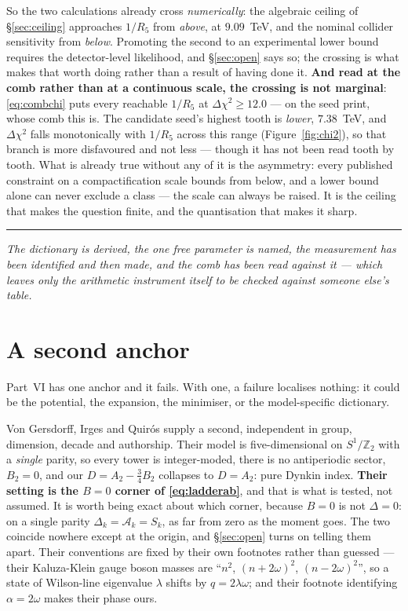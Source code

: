 \documentclass[11pt,a4paper]{article}
\newcommand{\ZZ}{\mathbb{Z}}
\newcommand{\bridge}[1]{\par\medskip\noindent
  \textcolor{hdrblue!45}{\rule{2.2cm}{0.6pt}}\;\;\parbox[t]{0.84\textwidth}{\small\itshape
  \textcolor{hdrblue!85}{#1}}\par\medskip}
\newenvironment{keyeq}
  {\begin{center}\setlength{\fboxsep}{9pt}\setlength{\fboxrule}{0.8pt}%
   \begin{lrbox}{\keyeqbox}\begin{minipage}{0.88\textwidth}}
  {\end{minipage}\end{lrbox}%
   \fcolorbox{hdrblue!55}{hdrblue!6}{\usebox{\keyeqbox}}\end{center}}
\begin{document}
\begin{keyeq}
So the two calculations already cross \emph{numerically}: the algebraic ceiling of
\S\ref{sec:ceiling} approaches $1/R_5$ from \emph{above}, at $9.09$~TeV, and the nominal collider
sensitivity from \emph{below}. Promoting the second to an experimental lower bound requires the
detector-level likelihood, and \S\ref{sec:open} says so; the crossing is what makes that worth
doing rather than a result of having done it. \textbf{And read at the comb rather than at a
continuous scale, the crossing is not marginal}: \eqref{eq:combchi} puts every reachable
$1/R_5$ at $\Delta\chi^2\ge12.0$ --- on the seed \cite{KM25} print, whose comb this is. The
candidate seed's highest tooth is \emph{lower}, $7.38$~TeV, and $\Delta\chi^2$ falls
monotonically with $1/R_5$ across this range (Figure~\ref{fig:chi2}), so that branch is more
disfavoured and not less --- though it has not been read tooth by tooth. What is already true without any of it is the asymmetry:
every published constraint on a compactification scale bounds from below, and a lower bound alone
can never exclude a class --- the scale can always be raised. It is the ceiling that makes the
question finite, and the quantisation that makes it sharp.
\end{keyeq}

\bridge{The dictionary is derived, the one free parameter is named, the measurement has been
identified and then made, and the comb has been read against it --- which leaves only the
arithmetic instrument itself to be checked against someone else's table.}

\section{A second anchor}\label{sec:anchor}

Part~VI has one anchor and it fails. With one, a failure localises nothing: it could be the
potential, the expansion, the minimiser, or the model-specific dictionary.

Von Gersdorff, Irges and Quir\'os \cite{vGIQ} supply a second, independent in group, dimension,
decade and authorship. Their model is five-dimensional on $S^1/\ZZ_2$ with a \emph{single} parity, so
every tower is integer-moded, there is no antiperiodic sector, $B_2=0$, and our
$D=A_2-\tfrac34B_2$ collapses to $D=A_2$: pure Dynkin index. \textbf{Their setting is the $B=0$
corner of \eqref{eq:ladderab}}, and that is what is tested, not assumed. It is worth being exact
about which corner, because $B=0$ is not $\Delta=0$: on a single parity $\Delta_k=\mathcal{A}_k=S_k$, as far
from zero as the moment goes. The two coincide nowhere except at the origin, and \S\ref{sec:open}
turns on telling them apart. Their conventions are fixed
by their own footnotes rather than guessed --- their Kaluza-Klein gauge boson masses are
``$n^2$, $(n+2\omega)^2$, $(n-2\omega)^2$'', so a state of Wilson-line eigenvalue $\lambda$ shifts by
$q=2\lambda\omega$; and their footnote identifying $\alpha=2\omega$ makes their phase ours.
\end{document}
